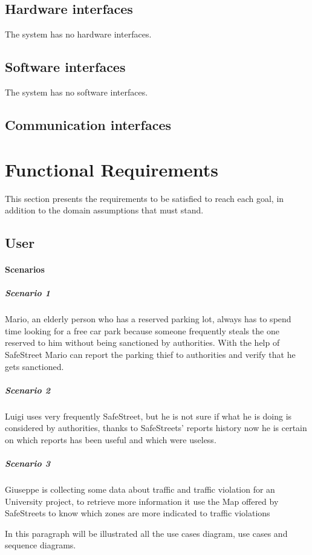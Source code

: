 \documentclass[12pt,a4paper]{report}
\begin{document}
		\subsection{Hardware interfaces}
			The system has no hardware interfaces.
		\subsection{Software interfaces}
			The system has no software interfaces.
		\subsection{Communication interfaces}
	\section{Functional Requirements}
		This section presents the requirements to be satisfied to reach each goal, in addition to the domain assumptions that must stand.
		\subsection{User} 
			\paragraph{Scenarios}
				\subparagraph{Scenario 1}
					Mario, an elderly person who has a reserved parking lot, always has to spend time looking for a free
					car park because someone frequently steals the one reserved to him without being sanctioned by
					authorities. With the help of SafeStreet Mario can report the parking thief to authorities and verify
					that he gets sanctioned.
					
				\subparagraph{Scenario 2}
					Luigi uses very frequently SafeStreet, but he is not sure if what he is doing is considered by authorities,
					thanks to SafeStreets' reports history now he is certain on which reports has been useful and which
					were useless.
					
				\subparagraph{Scenario 3}
					Giuseppe is collecting some data about traffic and traffic violation for an University project, to retrieve more
					information it use the Map offered by SafeStreets to know which zones are more indicated to traffic violations
					
				
				In this paragraph will be illustrated all the use cases diagram, use cases and sequence diagrams.
					
\end{document}
